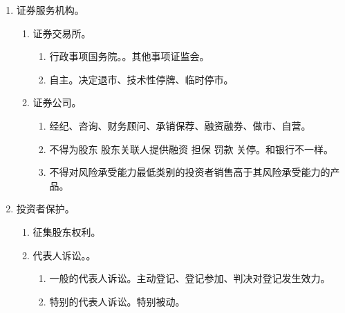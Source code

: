 \begin{enumerate}
\begin{enumerate}
\begin{enumerate}
                  \item 5\%后，每增减 1\%。次日内临时报告 + 通知 + 公告。
                  \item 每增减 5\%。报告 + 公告 + 6 日禁止交易（冷静期）。
                \end{enumerate}
          \item 协议收购达 30\%，继续收购。
                \begin{enumerate}
                  \item 信息披露。
                  \item 变为强制要约收购。强制 = 不可撤销，但能变更收购条件。
                \end{enumerate}
        \end{enumerate}
  \item 证券服务机构。
        \begin{enumerate}
          \item 证券交易所。
                \begin{enumerate}
                  \item 行政事项国务院。。其他事项证监会。
                  \item 自主。决定退市、技术性停牌、临时停市。
                \end{enumerate}
          \item 证券公司。
                \begin{enumerate}
                  \item 经纪、咨询、财务顾问、承销保荐、融资融券、做市、自营。
                  \item 不得为股东 \hz 股东关联人提供融资 \hz 担保 \yjt 罚款 \yjt 关停。和银行不一样。
                  \item 不得对风险承受能力最低类别的投资者销售高于其风险承受能力的产品。
                \end{enumerate}
        \end{enumerate}
  \item 投资者保护。
        \begin{enumerate}
          \item 征集股东权利。
          \item 代表人诉讼。。
                \begin{enumerate}
                  \item 一般的代表人诉讼。主动登记、登记参加、判决对登记发生效力。
                  \item 特别的代表人诉讼。特别被动。

\end{enumerate}
\end{enumerate}
\end{enumerate}
